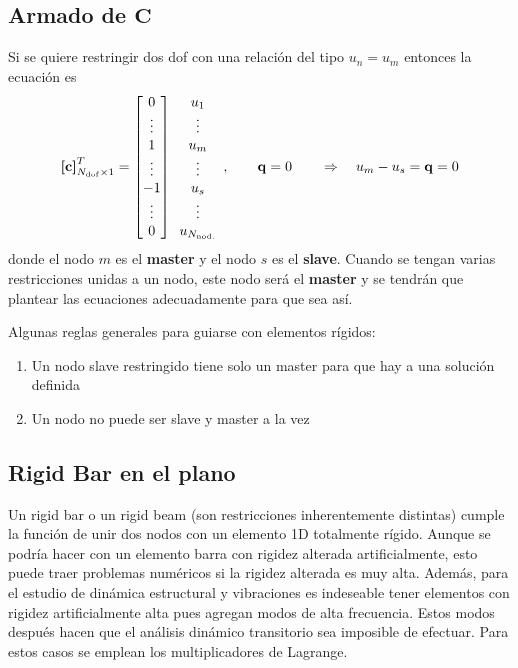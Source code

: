 \documentclass[11pt, a4paper,titlepage]{article}
\newcommand{\Mme}[1]{\boldsymbol{[}\mathbf{#1} \boldsymbol{]}}
\begin{document}
\subsection*{Armado de $\mathbf{C}$}
Si se quiere restringir dos dof con una relación del tipo $u_n=u_m$ entonces la ecuación es
\[
\Mme{c}^T_{\Ndof \times 1} = \begin{bmatrix}
0 \\ 
\vdots \\
1 \\
\vdots \\
-1 \\
\vdots \\
0
\end{bmatrix}\begin{array}{c}
u_1\\
\vdots \\
u_m \\
\vdots \\
u_s \\
\vdots \\
u_{\Nnod}
\end{array}
,
\qquad 
\mathbf{q} = 0
\qquad \Rightarrow \quad u_m-u_s = \mathbf{q} = 0
\]
donde el nodo $m$ es el \textbf{master} y el nodo $s$ es el \textbf{slave}. Cuando se tengan varias restricciones unidas a un nodo, este nodo será el \textbf{master} y se tendrán que plantear las ecuaciones adecuadamente para que sea así.

 Algunas reglas generales para guiarse con elementos rígidos:
\begin{enumerate}
	\item Un nodo slave restringido tiene solo un master para que hay a una solución definida
	\item Un nodo no puede ser slave y master a la vez
\end{enumerate}


\subsection*{Rigid Bar en el plano}
Un rigid bar o un rigid beam (son restricciones inherentemente distintas) cumple la función de unir dos nodos con un elemento 1D totalmente rígido. Aunque se podría hacer con un elemento barra con rigidez alterada artificialmente, esto puede traer problemas numéricos si la rigidez alterada es muy alta. Además, para el estudio de dinámica estructural y vibraciones es indeseable tener elementos con rigidez artificialmente alta pues agregan modos de alta frecuencia. Estos modos después hacen que el análisis dinámico transitorio sea imposible de efectuar. Para estos casos se emplean los multiplicadores de Lagrange.
\end{document}
